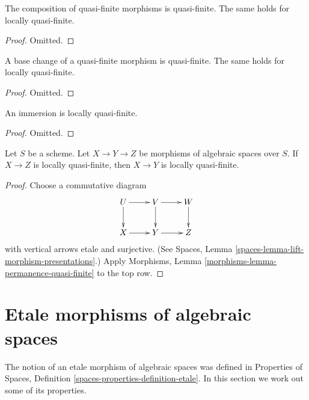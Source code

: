 \begin{lemma}
\label{lemma-composition-quasi-finite}
The composition of quasi-finite morphisms is quasi-finite.
The same holds for locally quasi-finite.
\end{lemma}

\begin{proof}
Omitted.
\end{proof}

\begin{lemma}
\label{lemma-base-change-quasi-finite}
A base change of a quasi-finite morphism is quasi-finite.
The same holds for locally quasi-finite.
\end{lemma}

\begin{proof}
Omitted.
\end{proof}

\begin{lemma}
\label{lemma-immersion-quasi-finite}
An immersion is locally quasi-finite.
\end{lemma}

\begin{proof}
Omitted.
\end{proof}

\begin{lemma}
\label{lemma-permanence-quasi-finite}
Let $S$ be a scheme.
Let $X \to Y \to Z$ be morphisms of algebraic spaces over $S$.
If $X \to Z$ is locally quasi-finite, then $X \to Y$
is locally quasi-finite.
\end{lemma}

\begin{proof}
Choose a commutative diagram
$$
\xymatrix{
U \ar[d] \ar[r] & V \ar[d] \ar[r] & W \ar[d] \\
X \ar[r] & Y \ar[r] & Z
}
$$
with vertical arrows etale and surjective. (See
Spaces, Lemma \ref{spaces-lemma-lift-morphism-presentations}.)
Apply
Morphisms, Lemma \ref{morphisms-lemma-permanence-quasi-finite}
to the top row.
\end{proof}





\section{Etale morphisms of algebraic spaces}
\label{section-etale}

\noindent
The notion of an etale morphism of algebraic spaces was defined in
Properties of Spaces, Definition \ref{spaces-properties-definition-etale}.
In this section we work out some of its properties.

